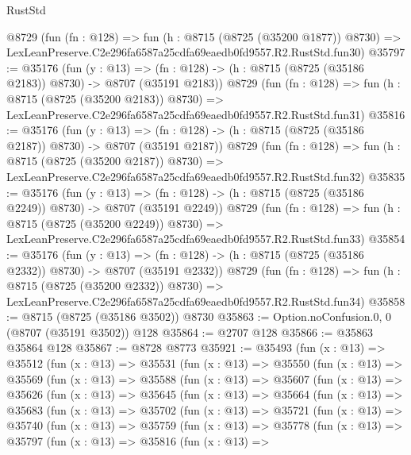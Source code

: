 \begin{lexlean}{RustStd}
\begin{coremodule}
    @8729
    (fun (fn : @128) =>
    fun (h : @8715 (@8725 (@35200 @1877)) @8730) =>
    LexLeanPreserve.C2e296fa6587a25cdfa69eaedb0fd9557.R2.RustStd.fun30)
@35797 := @35176
    (fun (y : @13) =>
    (fn : @128) -> (h : @8715 (@8725 (@35186 @2183)) @8730) -> @8707 (@35191 @2183))
    @8729
    (fun (fn : @128) =>
    fun (h : @8715 (@8725 (@35200 @2183)) @8730) =>
    LexLeanPreserve.C2e296fa6587a25cdfa69eaedb0fd9557.R2.RustStd.fun31)
@35816 := @35176
    (fun (y : @13) =>
    (fn : @128) -> (h : @8715 (@8725 (@35186 @2187)) @8730) -> @8707 (@35191 @2187))
    @8729
    (fun (fn : @128) =>
    fun (h : @8715 (@8725 (@35200 @2187)) @8730) =>
    LexLeanPreserve.C2e296fa6587a25cdfa69eaedb0fd9557.R2.RustStd.fun32)
@35835 := @35176
    (fun (y : @13) =>
    (fn : @128) -> (h : @8715 (@8725 (@35186 @2249)) @8730) -> @8707 (@35191 @2249))
    @8729
    (fun (fn : @128) =>
    fun (h : @8715 (@8725 (@35200 @2249)) @8730) =>
    LexLeanPreserve.C2e296fa6587a25cdfa69eaedb0fd9557.R2.RustStd.fun33)
@35854 := @35176
    (fun (y : @13) =>
    (fn : @128) -> (h : @8715 (@8725 (@35186 @2332)) @8730) -> @8707 (@35191 @2332))
    @8729
    (fun (fn : @128) =>
    fun (h : @8715 (@8725 (@35200 @2332)) @8730) =>
    LexLeanPreserve.C2e296fa6587a25cdfa69eaedb0fd9557.R2.RustStd.fun34)
@35858 := @8715 (@8725 (@35186 @3502)) @8730
@35863 := Option.noConfusion.{0, 0} (@8707 (@35191 @3502)) @128
@35864 := @2707 @128
@35866 := @35863 @35864 @128
@35867 := @8728 @8773
@35921 := @35493
    (fun (x : @13) =>
    @35512
      (fun (x : @13) =>
      @35531
        (fun (x : @13) =>
        @35550
          (fun (x : @13) =>
          @35569
            (fun (x : @13) =>
            @35588
              (fun (x : @13) =>
              @35607
                (fun (x : @13) =>
                @35626
                  (fun (x : @13) =>
                  @35645
                    (fun (x : @13) =>
                    @35664
                      (fun (x : @13) =>
                      @35683
                        (fun (x : @13) =>
                        @35702
                          (fun (x : @13) =>
                          @35721
                            (fun (x : @13) =>
                            @35740
                              (fun (x : @13) =>
                              @35759
                                (fun (x : @13) =>
                                @35778
                                  (fun (x : @13) =>
                                  @35797
                                    (fun (x : @13) =>
                                    @35816
                                      (fun (x : @13) =>

\end{coremodule}
\end{lexlean}
